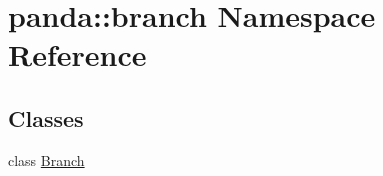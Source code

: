 \hypertarget{namespacepanda_1_1branch}{
\section{panda::branch Namespace Reference}
\label{namespacepanda_1_1branch}
}
\subsection*{Classes}
\begin{DoxyCompactItemize}
\item 
class \hyperlink{classpanda_1_1branch_1_1Branch}{Branch}
\end{DoxyCompactItemize}
